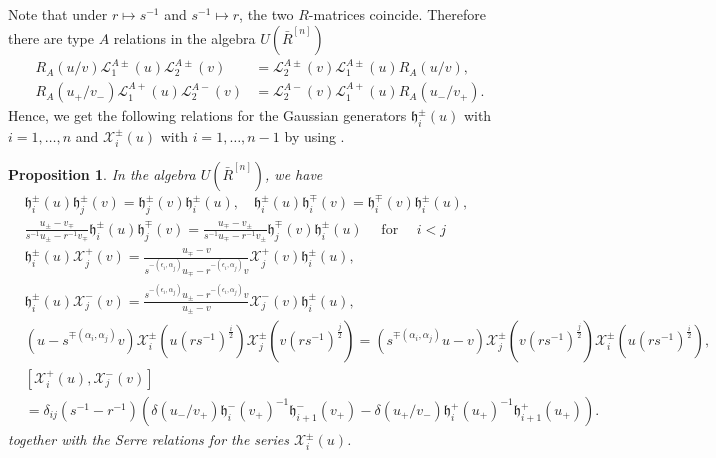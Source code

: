 \documentclass[10pt,a4paper]{amsart}
\newtheorem{proposition}[theorem]{Proposition}
\numberwithin{equation}{section}
\begin{document}
 Note that under $r\mapsto s^{-1}$ and $s^{-1}\mapsto r$, the two $R$-matrices coincide. Therefore
there are type $A$ relations in the algebra $U\left(\bar{R}^{[n]}\right)$
 $$
 \begin{aligned}
 	R_A(u / v) \mathcal{L}_1^{A \pm}(u) \mathcal{L}_2^{A \pm}(v) & =\mathcal{L}_2^{A \pm}(v) \mathcal{L}_1^{A \pm}(u) R_A(u / v), \\
 	R_A\left(u_+/ v_-\right) \mathcal{L}_1^{A+}(u) \mathcal{L}_2^{A-}(v) & =\mathcal{L}_2^{A-}(v) \mathcal{L}_1^{A+}(u) R_A\left(u_-/ v_+\right) .
 \end{aligned}
 $$
 Hence, we get the following relations for the Gaussian generators $\mathfrak{h}_i^{ \pm}(u)$ with $i=1, \ldots, n$ and $\mathcal{X}_i^{ \pm}(u)$ with $i=1, \ldots, n-1$ by using \cite{JL2}.
 	\begin{proposition}	
 In the algebra $U\left(\bar{R}^{[n]}\right)$, we have
 \begin{align*}
& \mathfrak{h}_i^{ \pm}(u) \mathfrak{h}_j^{ \pm}(v)=\mathfrak{h}_j^{ \pm}(v) \mathfrak{h}_i^{ \pm}(u), \quad \mathfrak{h}_i^{ \pm}(u) \mathfrak{h}_i^{\mp}(v)=\mathfrak{h}_i^{\mp}(v) \mathfrak{h}_i^{ \pm}(u), \\
& \frac{u_{ \pm}-v_{\mp}}{s^{-1} u_{ \pm}-r^{-1} v_{\mp}} \mathfrak{h}_i^{ \pm}(u) \mathfrak{h}_j^{\mp}(v)=\frac{u_{\mp}-v_{ \pm}}{s^{-1}u_{\mp}-r^{-1} v_{ \pm}} \mathfrak{h}_j^{\mp}(v) \mathfrak{h}_i^{ \pm}(u) \quad \text { for } \quad i<j\\
& \mathfrak{h}_i^{ \pm}(u) \mathcal{X}_j^{+}(v)=\frac{u_{\mp}-v}{s^{-\left(\epsilon_i, \alpha_j\right)} u_{\mp}-r^{-\left(\epsilon_i, \alpha_j\right)} v} \mathcal{X}_j^{+}(v) \mathfrak{h}_i^{ \pm}(u),\\
& \mathfrak{h}_i^{ \pm}(u) \mathcal{X}_j^{-}(v)=\frac{s^{-\left(\epsilon_i, \alpha_j\right)} u_{ \pm}-r^{-\left(\epsilon_i, \alpha_j\right)} v}{u_{ \pm}-v} \mathcal{X}_j^{-}(v) \mathfrak{h}_i^{ \pm}(u), \\
& (u-s^{\mp(\alpha_i, \alpha_j)} v) \mathcal{X}_i^{ \pm}(u(r s^{-1})^{\frac{i}{2}}) \mathcal{X}_j^{ \pm}(v(r s^{-1})^{\frac{j}{2}})
 =(s^{\mp(\alpha_i, \alpha_j)} u-v) \mathcal{X}_j^{ \pm}(v(r s^{-1})^{\frac{j}{2}}) \mathcal{X}_i^{ \pm}(u(r s^{-1})^{\frac{i}{2}}), \\
& \left[\mathcal{X}_i^{+}(u), \mathcal{X}_j^{-}(v)\right]\\
&=\delta_{i j}\left(s^{-1}-r^{-1}\right)\left(\delta\left(u_{-} / v_{+}\right) \mathfrak{h}_i^{-}\left(v_{+}\right)^{-1} \mathfrak{h}_{i+1}^{-}\left(v_{+}\right)-\delta\left(u_{+} / v_{-}\right) \mathfrak{h}_i^{+}\left(u_{+}\right)^{-1} \mathfrak{h}_{i+1}^{+}\left(u_{+}\right)\right).
 \end{align*}
 together with the Serre relations for the series $\mathcal{X}_i^{ \pm}(u)$.
  	\end{proposition}
\end{document}
